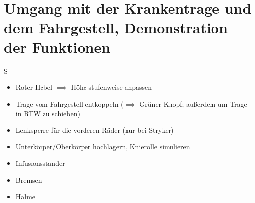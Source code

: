\chapter{Umgang mit der Krankentrage und dem Fahrgestell, Demonstration der Funktionen}S
\begin{itemize}
    \item Roter Hebel $\implies$ Höhe stufenweise anpassen
    \item Trage vom Fahrgestell entkoppeln ($\implies$ Grüner Knopf; außerdem um Trage in RTW zu schieben)
    \item Lenksperre für die vorderen Räder (nur bei Stryker)
    \item Unterkörper/Oberkörper hochlagern, Knierolle simulieren
    \item Infusionsständer
    \item Bremsen
    \item Halme
\end{itemize}